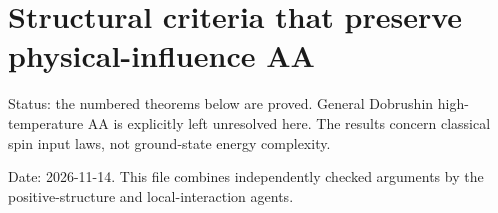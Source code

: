 \section{Structural criteria that preserve physical-influence
AA}\label{proof:positive_structure}

Status: the numbered theorems below are proved. General Dobrushin
high-temperature AA is explicitly left unresolved here. The results
concern classical spin input laws, not ground-state energy complexity.

Date: 2026-11-14. This file combines independently checked arguments by
the positive-structure and local-interaction agents.








